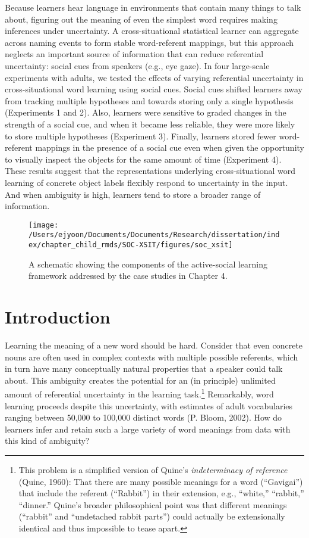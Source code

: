 \documentclass[oneside]{report}
\begin{document}
Because learners hear language in environments that contain many things
to talk about, figuring out the meaning of even the simplest word
requires making inferences under uncertainty. A cross-situational
statistical learner can aggregate across naming events to form stable
word-referent mappings, but this approach neglects an important source
of information that can reduce referential uncertainty: social cues from
speakers (e.g., eye gaze). In four large-scale experiments with adults,
we tested the effects of varying referential uncertainty in
cross-situational word learning using social cues. Social cues shifted
learners away from tracking multiple hypotheses and towards storing only
a single hypothesis (Experiments 1 and 2). Also, learners were sensitive
to graded changes in the strength of a social cue, and when it became
less reliable, they were more likely to store multiple hypotheses
(Experiment 3). Finally, learners stored fewer word-referent mappings in
the presence of a social cue even when given the opportunity to visually
inspect the objects for the same amount of time (Experiment 4). These
results suggest that the representations underlying cross-situational
word learning of concrete object labels flexibly respond to uncertainty
in the input. And when ambiguity is high, learners tend to store a
broader range of information.
\begin{figure}[!t]

{\centering \texttt{[image: /Users/ejyoon/Documents/Documents/Research/dissertation/index/chapter\_child\_rmds/SOC-XSIT/figures/soc\_xsit]} 

}

\caption[Overview of Chapter 4.]{A schematic showing the components of the active-social learning framework addressed by the case studies in Chapter 4.}\label{fig:schematic-soc-xsit}
\end{figure}
\section{Introduction}\label{introduction-2}

Learning the meaning of a new word should be hard. Consider that even
concrete nouns are often used in complex contexts with multiple possible
referents, which in turn have many conceptually natural properties that
a speaker could talk about. This ambiguity creates the potential for an
(in principle) unlimited amount of referential uncertainty in the
learning task.\footnote{This problem is a simplified version of Quine's
  \textit{indeterminacy of reference} (Quine, 1960): That there are many
  possible meanings for a word (``Gavigai'') that include the referent
  (``Rabbit'') in their extension, e.g., ``white,'' ``rabbit,''
  ``dinner.'' Quine's broader philosophical point was that different
  meanings (``rabbit'' and ``undetached rabbit parts'') could actually
  be extensionally identical and thus impossible to tease apart.}
Remarkably, word learning proceeds despite this uncertainty, with
estimates of adult vocabularies ranging between 50,000 to 100,000
distinct words (P. Bloom, 2002). How do learners infer and retain such a
large variety of word meanings from data with this kind of ambiguity?
\end{document}
